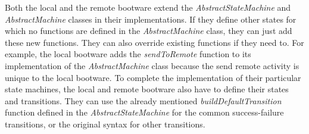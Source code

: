 \vspace*{\baselineskip}

Both the local and the remote bootware extend the \textit{AbstractStateMachine} and \textit{AbstractMachine} classes in their implementations.
If they define other states for which no functions are defined in the \textit{AbstractMachine} class, they can just add these new functions.
They can also override existing functions if they need to.
For example, the local bootware adds the \textit{sendToRemote} function to its implementation of the \textit{AbstractMachine} class because the send remote activity is unique to the local bootware.
To complete the implementation of their particular state machines, the local and remote bootware also have to define their states and transitions.
They can use the already mentioned \textit{buildDefaultTransition} function defined in the \textit{AbstractStateMachine} for the common success-failure transitions, or the original syntax for other transitions.
